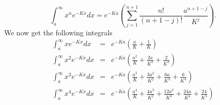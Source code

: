 \documentclass{article}
\numberwithin{equation}{section}
\begin{document}
\begin{enumerate}
\begin{equation}
\int_a^\infty x^n e^{-Kx}dx = 
e^{-Ka}
\left(\sum_{j=1}^{n+1}\frac{n!}{(n+1-j)!}\frac{a^{n+1-j}}{K^j}\right).
\end{equation}
We now get the following integrals
\begin{eqnarray}
\int_a^\infty xe^{-Kx}dx &=& e^{-Ka}\left(\frac{a}{K} + \frac{1}{K}\right)
    \label{a1e8} \\
\int_a^\infty x^2e^{-Kx}dx &=& e^{-Ka}\left(\frac{a^2}{K} + \frac{2a}{K^2}
	+ \frac{2}{K^3}\right) \label{a1e9} \\
\int_a^\infty x^3e^{-Kx}dx &=& e^{-Ka}\left(\frac{a^3}{K} + 
	\frac{3a^2}{K^2}
	+ \frac{6a}{K^3} + \frac{6}{K^4}\right) \label{a1e10} \\
\int_a^\infty x^4e^{-Kx}dx &=& e^{-Ka}\left(\frac{a^4}{K} + 
	\frac{4a^3}{K^2}
	+ \frac{12a^2}{K^3} + \frac{24a}{K^4}
	+ \frac{24}{K^5} \right) \label{a1e11}
\end{eqnarray}
\end{enumerate}
\end{document}
